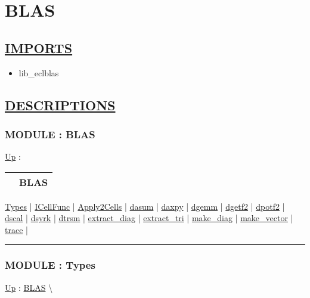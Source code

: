 \chapter*{BLAS}
\hypertarget{ecldoc:toc:BLAS}{}

\section*{\underline{IMPORTS}}
\begin{itemize}
\item lib\_eclblas
\end{itemize}

\section*{\underline{DESCRIPTIONS}}
\subsection*{MODULE : BLAS}
\hypertarget{ecldoc:BLAS}{}
\hyperlink{ecldoc:toc:root}{Up} :

{\renewcommand{\arraystretch}{1.5}
\begin{tabularx}{\textwidth}{|>{\raggedright\arraybackslash}l|X|}
\hline
\hspace{0pt} & BLAS \\
\hline
\end{tabularx}
}

\par


\hyperlink{ecldoc:BLAS.Types}{Types}  |
\hyperlink{ecldoc:blas.icellfunc}{ICellFunc}  |
\hyperlink{ecldoc:blas.apply2cells}{Apply2Cells}  |
\hyperlink{ecldoc:blas.dasum}{dasum}  |
\hyperlink{ecldoc:blas.daxpy}{daxpy}  |
\hyperlink{ecldoc:blas.dgemm}{dgemm}  |
\hyperlink{ecldoc:blas.dgetf2}{dgetf2}  |
\hyperlink{ecldoc:blas.dpotf2}{dpotf2}  |
\hyperlink{ecldoc:blas.dscal}{dscal}  |
\hyperlink{ecldoc:blas.dsyrk}{dsyrk}  |
\hyperlink{ecldoc:blas.dtrsm}{dtrsm}  |
\hyperlink{ecldoc:blas.extract_diag}{extract\_diag}  |
\hyperlink{ecldoc:blas.extract_tri}{extract\_tri}  |
\hyperlink{ecldoc:blas.make_diag}{make\_diag}  |
\hyperlink{ecldoc:blas.make_vector}{make\_vector}  |
\hyperlink{ecldoc:blas.trace}{trace}  |

\rule{\linewidth}{0.5pt}

\subsection*{MODULE : Types}
\hypertarget{ecldoc:BLAS.Types}{}
\hyperlink{ecldoc:BLAS}{Up} :
\hspace{0pt} \hyperlink{ecldoc:BLAS}{BLAS} \textbackslash 

